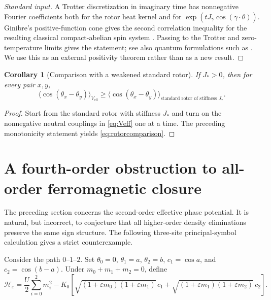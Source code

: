 \documentclass[11pt]{article}
\newtheorem{corollary}[theorem]{Corollary}
\newcommand{\cH}{\mathcal H}
\begin{document}
\begin{proof}[Standard input]
A Trotter discretization in imaginary time has nonnegative Fourier coefficients both for the rotor heat kernel and for $\exp(tJ_\gamma\cos(\gamma\cdot\theta))$. Ginibre's positive-function cone gives the second correlation inequality for the resulting classical compact-abelian spin system \cite{Ginibre1970,FrohlichPark1978}. Passing to the Trotter and zero-temperature limits gives the statement; see also quantum formulations such as \cite{Miyao2016,Miyao2015,BjornbergUeltschi2023}. We use this as an external positivity theorem rather than as a new result.
\end{proof}

\begin{corollary}[Comparison with a weakened standard rotor]
If $J_*>0$, then for every pair $x,y$,
\begin{equation}
\langle\cos(\theta_x-\theta_y)\rangle_{V_{\mathrm{eff}}}
\ge
\langle\cos(\theta_x-\theta_y)\rangle_{\text{standard rotor of stiffness }J_*}.
\label{eq:rotorcomparison}
\end{equation}
\end{corollary}

\begin{proof}
Start from the standard rotor with stiffness $J_*$ and turn on the nonnegative neutral couplings in \eqref{eq:Veff} one at a time. The preceding monotonicity statement yields \eqref{eq:rotorcomparison}.
\end{proof}

\section{A fourth-order obstruction to all-order ferromagnetic closure}

The preceding section concerns the second-order effective phase potential. It is natural, but incorrect, to conjecture that all higher-order density eliminations preserve the same sign structure. The following three-site principal-symbol calculation gives a strict counterexample.

Consider the path $0$--$1$--$2$. Set $\theta_0=0$, $\theta_1=a$, $\theta_2=b$, $c_1=\cos a$, and $c_2=\cos(b-a)$. Under $m_0+m_1+m_2=0$, define
\begin{equation}
\cH_\varepsilon
=\frac U2\sum_{i=0}^2m_i^2
-K_0\left[
\sqrt{(1+\varepsilon m_0)(1+\varepsilon m_1)}\,c_1
+\sqrt{(1+\varepsilon m_1)(1+\varepsilon m_2)}\,c_2
\right].
\label{eq:classical3site}
\end{equation}
\end{document}
